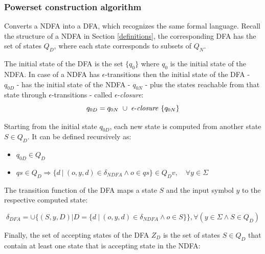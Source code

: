 \subsubsection{Powerset construction algorithm}
Converts a NDFA into a DFA, which recognizes the same formal language. Recall the structure of a NDFA in Section \ref{definitions}, the corresponding DFA has the set of states $Q_D$, where each state corresponds to subsets of $Q_N$. 

The initial state of the DFA is the set $\{q_0\}$ where $q_0$ is the initial state of the NDFA. In case of a NDFA has $\epsilon$-transitions then the initial state of the DFA - $q_{0D}$ - has the initial state of the NDFA - $q_{0N}$ - plus the states reachable from that state through $\epsilon$-transitions - called $\epsilon$-\textit{closure}:
\begin{equation*}
    q_{0D} = q_{0N}\ \cup \ \epsilon\text{-\textit{closure}} \ \{q_{0N}\}
\end{equation*}

Starting from the initial state $q_{0D}$, each new state is computed from another state $S \in Q_D$. It can be defined recursively as:
\begin{itemize}
    \item $q_{0D} \in Q_D$
    \item $qs \in Q_D \Rightarrow \{ d\ |\ (o,y,d) \in \delta_{NDFA} \wedge o \in qs\} \in Q_Dv , \quad \forall y \in \Sigma$
\end{itemize}


The transition function of the DFA maps a state $S$ and the input symbol $y$ to the respective computed state:

\begin{equation*}
    \delta_{DFA} = \cup \{(S,y,D) | D = \{ d\ |\ (o,y,d) \in \delta_{NDFA} \wedge o \in S\}\}, \forall{(y \in \Sigma \wedge S \in Q_D)}
\end{equation*}

Finally, the set of accepting states of the DFA $Z_D$ is the set of states $S \in Q_D$ that contain at least one state that is accepting state in the NDFA:

